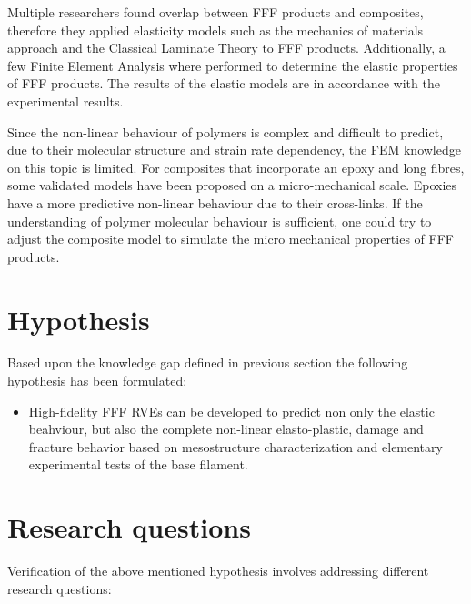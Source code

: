 Multiple researchers found overlap between FFF products and composites, therefore they applied elasticity models such as the mechanics of materials approach and the Classical Laminate Theory to FFF products. Additionally, a few Finite Element Analysis where performed to determine the elastic properties of FFF products. The results of the elastic models are in accordance with the experimental results.

Since the non-linear behaviour of polymers is complex and difficult to predict, due to their molecular structure and strain rate dependency, the FEM knowledge on this topic is limited. For composites that incorporate an epoxy and long fibres, some validated models have been proposed on a micro-mechanical scale. Epoxies have a more predictive non-linear behaviour due to their cross-links. If the understanding of polymer molecular behaviour is sufficient, one could try to adjust the composite model to simulate the micro mechanical properties of FFF products. 

\section{Hypothesis}
Based upon the knowledge gap defined in previous section the following hypothesis has been formulated:


\begin{itemize}
	\item High-fidelity FFF RVEs can be developed to predict non only the elastic beahviour, but also the complete non-linear elasto-plastic, damage and fracture behavior based on mesostructure characterization and elementary experimental tests of the base filament.
\end{itemize}



\section{Research questions}
    \label{Research questions}
Verification of the above mentioned hypothesis involves addressing different research questions:

